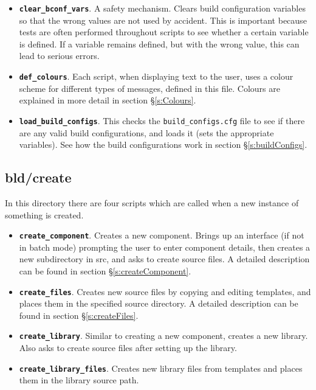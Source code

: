 \documentclass[a4paper, oneside, 11pt, titlepage, onecolumn, openright]{report}
\begin{document}
\begin{itemize}

\item \textbf{\texttt{clear\_bconf\_vars}}. A safety mechanism. Clears build configuration variables so that the wrong values are not used by accident. This is important because tests are often performed throughout scripts to see whether a certain variable is defined. If a variable remains defined, but with the wrong value, this can lead to serious errors.

\item \textbf{\texttt{def\_colours}}. Each script, when displaying text to the user, uses a colour scheme for different types of messages, defined in this file. Colours are explained in more detail in section \S\ref{s:Colours}.

\item \textbf{\texttt{load\_build\_configs}}. This checks the \texttt{build\_configs.cfg} file to see if there are any valid build configurations, and loads it (sets the appropriate variables). See how the build configurations work in section \S\ref{s:buildConfigs}.

\end{itemize}			
			
\subsection{bld/create}
			\label{ss:bld/create}
			In this directory there are four scripts which are called when a new instance of something is created.
			
\begin{itemize}

\item \textbf{\texttt{create\_component}}. Creates a new component. Brings up an interface (if not in batch mode) prompting the user to enter component details, then creates a new subdirectory in src, and asks to create source files. A detailed description can be found in section \S\ref{s:createComponent}.

\item \textbf{\texttt{create\_files}}. Creates new source files by copying and editing templates, and places them in the specified source directory. A detailed description can be found in section \S\ref{s:createFiles}.

\item \textbf{\texttt{create\_library}}. Similar to creating a new component, creates a new library. Also asks to create source files after setting up the library.

\item \textbf{\texttt{create\_library\_files}}. Creates new library files from templates and places them in the library source path.

\end{itemize}			
\end{document}
